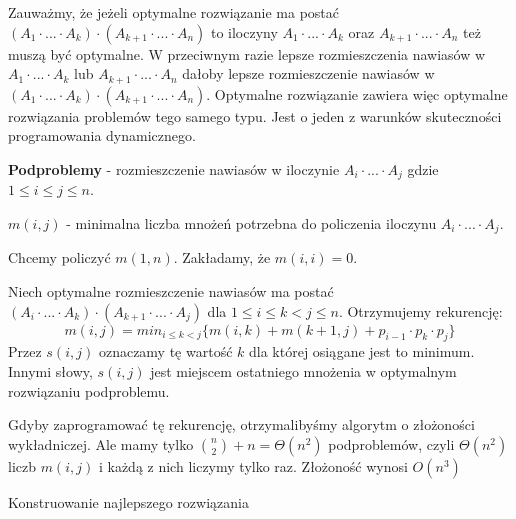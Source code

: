 Zauważmy, że jeżeli optymalne rozwiązanie ma postać $(A_1 \cdot ... \cdot A_k) \cdot (A_{k+1} \cdot ... \cdot A_n)$ to iloczyny $A_1 \cdot ... \cdot A_k$ oraz $A_{k+1} \cdot ... \cdot A_n$  też muszą być optymalne. W przeciwnym razie lepsze rozmieszczenia nawiasów w $A_1 \cdot ... \cdot A_k$ lub $A_{k+1} \cdot ... \cdot A_n$ dałoby lepsze rozmieszczenie nawiasów w $(A_1 \cdot ... \cdot A_k) \cdot (A_{k+1} \cdot ... \cdot A_n)$. Optymalne rozwiązanie zawiera więc optymalne rozwiązania problemów tego samego typu. Jest o jeden z warunków skuteczności programowania dynamicznego.


\textbf{Podproblemy} - rozmieszczenie nawiasów w iloczynie $A_i \cdot ... \cdot A_j$ gdzie $1 \leq i \leq j \leq n$. 

$m(i,j)$ - minimalna liczba mnożeń potrzebna do policzenia iloczynu $A_i \cdot ... \cdot A_j$.

Chcemy policzyć $m(1,n)$. Zakładamy, że $m(i,i) = 0$. 

Niech optymalne rozmieszczenie nawiasów ma postać $(A_i \cdot ... \cdot A_k) \cdot (A_{k+1} \cdot ... \cdot A_j)$ dla $1 \leq  i \leq k < j \leq n$. Otrzymujemy rekurencję: 
$$m(i,j) = min_{i \leq k < j} \{ m(i,k) +m(k+1,j) + p_{i-1} \cdot p_k \cdot p_j \}$$
Przez $s(i,j)$ oznaczamy tę wartość $k$ dla której osiągane jest to minimum. Innymi słowy, $s(i,j)$ jest miejscem ostatniego mnożenia w optymalnym rozwiązaniu podproblemu. 

Gdyby zaprogramować tę rekurencję, otrzymalibyśmy algorytm o złożoności wykładniczej. Ale mamy tylko $\binom{n}{2} + n = \Theta(n^2)$ podproblemów, czyli $\Theta(n^2)$ liczb $m(i,j)$ i każdą z nich liczymy tylko raz.
%
Złożoność wynosi $O(n^3)$

Konstruowanie najlepszego rozwiązania


